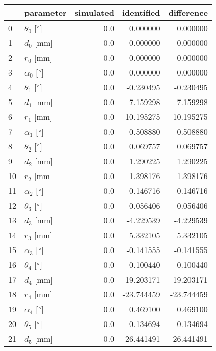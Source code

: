\documentclass{standalone}%
\begin{document}
%
\normalsize%
\begin{tabular}{llrrr}
\toprule
{} &                 parameter & simulated & identified & difference \\
\midrule
0  &  $\theta_{0}$ [$\degree$] &       0.0 &   0.000000 &   0.000000 \\
1  &              $d_{0}$ [mm] &       0.0 &   0.000000 &   0.000000 \\
2  &              $r_{0}$ [mm] &       0.0 &   0.000000 &   0.000000 \\
3  &  $\alpha_{0}$ [$\degree$] &       0.0 &   0.000000 &   0.000000 \\
4  &  $\theta_{1}$ [$\degree$] &       0.0 &  -0.230495 &  -0.230495 \\
5  &              $d_{1}$ [mm] &       0.0 &   7.159298 &   7.159298 \\
6  &              $r_{1}$ [mm] &       0.0 & -10.195275 & -10.195275 \\
7  &  $\alpha_{1}$ [$\degree$] &       0.0 &  -0.508880 &  -0.508880 \\
8  &  $\theta_{2}$ [$\degree$] &       0.0 &   0.069757 &   0.069757 \\
9  &              $d_{2}$ [mm] &       0.0 &   1.290225 &   1.290225 \\
10 &              $r_{2}$ [mm] &       0.0 &   1.398176 &   1.398176 \\
11 &  $\alpha_{2}$ [$\degree$] &       0.0 &   0.146716 &   0.146716 \\
12 &  $\theta_{3}$ [$\degree$] &       0.0 &  -0.056406 &  -0.056406 \\
13 &              $d_{3}$ [mm] &       0.0 &  -4.229539 &  -4.229539 \\
14 &              $r_{3}$ [mm] &       0.0 &   5.332105 &   5.332105 \\
15 &  $\alpha_{3}$ [$\degree$] &       0.0 &  -0.141555 &  -0.141555 \\
16 &  $\theta_{4}$ [$\degree$] &       0.0 &   0.100440 &   0.100440 \\
17 &              $d_{4}$ [mm] &       0.0 & -19.203171 & -19.203171 \\
18 &              $r_{4}$ [mm] &       0.0 & -23.744459 & -23.744459 \\
19 &  $\alpha_{4}$ [$\degree$] &       0.0 &   0.469100 &   0.469100 \\
20 &  $\theta_{5}$ [$\degree$] &       0.0 &  -0.134694 &  -0.134694 \\
21 &              $d_{5}$ [mm] &       0.0 &  26.441491 &  26.441491 \\

\end{tabular}
\end{document}
